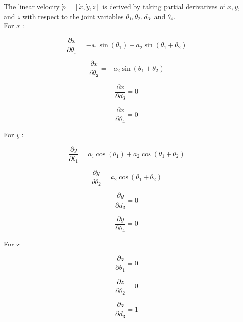 \documentclass[12pt]{report}
\begin{document}
The linear velocity $\dot{p}=[\dot{x}, \dot{y}, \dot{z}]$ is derived by taking partial derivatives of $x, y$, and $z$ with respect to the joint variables $\theta_1, \theta_2, d_3$, and $\theta_4$.
\\For $x$ :

\begin{equation}
	\frac{\partial x}{\partial \theta_1} = -a_1 \sin \left(\theta_1\right) - a_2 \sin \left(\theta_1 + \theta_2\right)
\end{equation}

\begin{equation}
	\frac{\partial x}{\partial \theta_2} = -a_2 \sin \left(\theta_1 + \theta_2\right)
\end{equation}

\begin{equation}
	\frac{\partial x}{\partial d_3} = 0
\end{equation}

\begin{equation}
	\frac{\partial x}{\partial \theta_4} = 0
\end{equation}

For $y$ :

\begin{equation}
	\frac{\partial y}{\partial \theta_1} = a_1 \cos \left(\theta_1\right) + a_2 \cos \left(\theta_1 + \theta_2\right)
\end{equation}

\begin{equation}
	\frac{\partial y}{\partial \theta_2} = a_2 \cos \left(\theta_1 + \theta_2\right)
\end{equation}

\begin{equation}
	\frac{\partial y}{\partial d_3} = 0
\end{equation}

\begin{equation}
	\frac{\partial y}{\partial \theta_4} = 0
\end{equation}


For z:

\begin{equation}
	\frac{\partial z}{\partial \theta_1} = 0
\end{equation}

\begin{equation}
	\frac{\partial z}{\partial \theta_2} = 0
\end{equation}

\begin{equation}
	\frac{\partial z}{\partial d_3} = 1
\end{equation}
\end{document}
